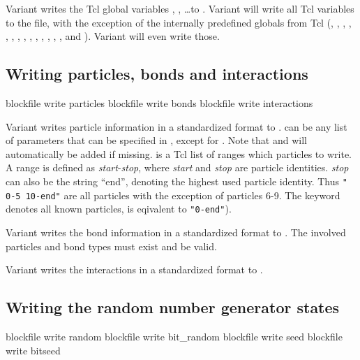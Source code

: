Variant  writes the Tcl global variables ,
, \dots to . Variant  will write
all Tcl variables to the file, with the exception of the internally
predefined globals from Tcl (, ,
, , , ,
, , , ,
, , , ,
 and ). Variant  will
even write those.

\subsection{Writing particles, bonds and interactions}
\begin{essyntax}
   blockfile  write particles 
   
   blockfile  write bonds 
   blockfile  write interactions
\end{essyntax}

Variant  writes
particle information in a standardized format to .
 can be any list of parameters that can be specified in
, except for .  Note that
 and  will automatically be added if missing.
 is a Tcl list of ranges which particles to write. A range
is defined as \textit{start}-\textit{stop}, where \textit{start} and
\textit{stop} are particle identities. \textit{stop} can also be the
string ``end'', denoting the highest used particle identity. Thus
\texttt{"{} 0-5 10-end"{}} are all particles with the exception of
particles 6-9.  The keyword  denotes all known particles,
\ie{} is eqivalent to \texttt{"0-end"{}}).

Variant  writes the bond information in a standardized
format to . The involved particles and bond types must
exist and be valid.

Variant  writes the interactions in a standardized format
to .

\subsection{Writing the random number generator states}
\begin{essyntax}
   blockfile  write random
   blockfile  write bit_random
   blockfile  write seed
   blockfile  write bitseed
\end{essyntax}

